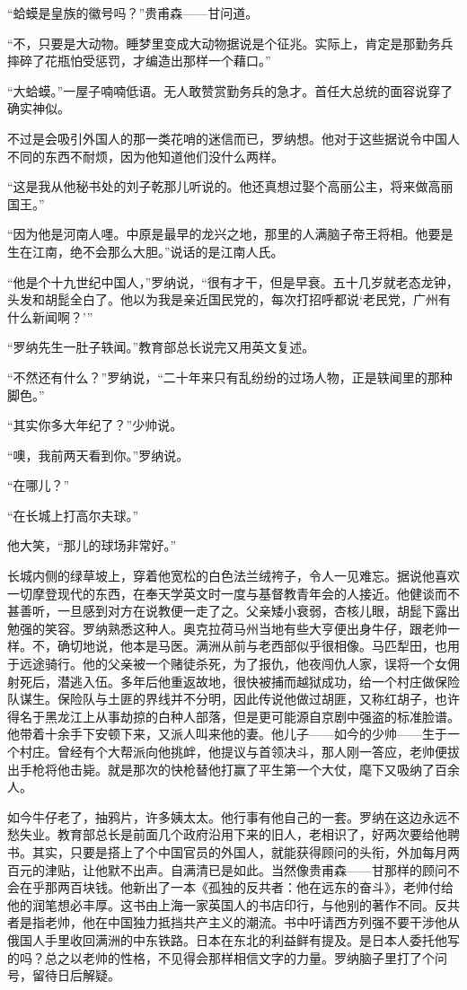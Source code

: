 \par “蛤蟆是皇族的徽号吗？”贵甫森——甘问道。
\par “不，只要是大动物。睡梦里变成大动物据说是个征兆。实际上，肯定是那勤务兵摔碎了花瓶怕受惩罚，才编造出那样一个藉口。”
\par “大蛤蟆。”一屋子喃喃低语。无人敢赞赏勤务兵的急才。首任大总统的面容说穿了确实神似。
\par 不过是会吸引外国人的那一类花哨的迷信而已，罗纳想。他对于这些据说令中国人不同的东西不耐烦，因为他知道他们没什么两样。
\par “这是我从他秘书处的刘子乾那儿听说的。他还真想过娶个高丽公主，将来做高丽国王。”
\par “因为他是河南人嚜。中原是最早的龙兴之地，那里的人满脑子帝王将相。他要是生在江南，绝不会那么大胆。”说话的是江南人氏。
\par “他是个十九世纪中国人，”罗纳说，“很有才干，但是早衰。五十几岁就老态龙钟，头发和胡髭全白了。他以为我是亲近国民党的，每次打招呼都说‘老民党，广州有什么新闻啊？’”
\par “罗纳先生一肚子轶闻。”教育部总长说完又用英文复述。
\par “不然还有什么？”罗纳说，“二十年来只有乱纷纷的过场人物，正是轶闻里的那种脚色。”
\par “其实你多大年纪了？”少帅说。
\par “噢，我前两天看到你。”罗纳说。
\par “在哪儿？”
\par “在长城上打高尔夫球。”
\par 他大笑，“那儿的球场非常好。”
\par 长城内侧的绿草坡上，穿着他宽松的白色法兰绒袴子，令人一见难忘。据说他喜欢一切摩登现代的东西，在奉天学英文时一度与基督教青年会的人接近。他健谈而不甚善听，一旦感到对方在说教便一走了之。父亲矮小衰弱，杏核儿眼，胡髭下露出勉强的笑容。罗纳熟悉这种人。奥克拉荷马州当地有些大亨便出身牛仔，跟老帅一样。不，确切地说，他本是马医。满洲从前与老西部似乎很相像。马匹犁田，也用于远途骑行。他的父亲被一个赌徒杀死，为了报仇，他夜闯仇人家，误将一个女佣射死后，潜逃入伍。多年后他重返故地，很快被捕而越狱成功，给一个村庄做保险队谋生。保险队与土匪的界线并不分明，因此传说他做过胡匪，又称红胡子，也许得名于黑龙江上从事劫掠的白种人部落，但是更可能源自京剧中强盗的标准脸谱。他带着十余手下安顿下来，又派人叫来他的妻。他儿子——如今的少帅——生于一个村庄。曾经有个大帮派向他挑衅，他提议与首领决斗，那人刚一答应，老帅便拔出手枪将他击毙。就是那次的快枪替他打赢了平生第一个大仗，麾下又吸纳了百余人。
\par 如今牛仔老了，抽鸦片，许多姨太太。他行事有他自己的一套。罗纳在这边永远不愁失业。教育部总长是前面几个政府沿用下来的旧人，老相识了，好两次要给他聘书。其实，只要是搭上了个中国官员的外国人，就能获得顾问的头衔，外加每月两百元的津贴，让他默不出声。自满清已是如此。当然像贵甫森——甘那样的顾问不会在乎那两百块钱。他新出了一本《孤独的反共者：他在远东的奋斗》，老帅付给他的润笔想必丰厚。这书由上海一家英国人的书店印行，与他别的著作不同。反共者是指老帅，他在中国独力抵挡共产主义的潮流。书中吁请西方列强不要干涉他从俄国人手里收回满洲的中东铁路。日本在东北的利益鲜有提及。是日本人委托他写的吗？总之以老帅的性格，不见得会那样相信文字的力量。罗纳脑子里打了个问号，留待日后解疑。
